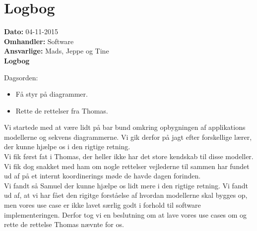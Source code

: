\section{Logbog}

\textbf{Dato:} 04-11-2015 \\
\textbf{Omhandler:} Software \\
\textbf{Ansvarlige:} Mads, Jeppe og Tine \\
\textbf{Logbog}

Dagsorden:
\begin{itemize}
	\item Få styr på diagrammer.
	\item Rette de rettelser fra Thomas. 
\end{itemize}

Vi startede med at være lidt på bar bund omkring opbygningen af applikations modellerne og sekvens diagrammerne. Vi gik derfor på jagt efter forskellige lærer, der kunne hjælpe os i den rigtige retning.\\
Vi fik først fat i Thomas, der heller ikke har det store kendskab til disse modeller. Vi fik dog snakket med ham om nogle rettelser vejlederne til sammen har fundet ud af på et internt koordinerings møde de havde dagen forinden. \\
Vi fandt så Samuel der kunne hjælpe os lidt mere i den rigtige retning. Vi fandt ud af, at vi har fået den rigitge forståelse af hvordan modellerne skal bygges op, men vores use case er ikke lavet særlig godt i forhold til software implementeringen. Derfor tog vi en beslutning om at lave vores use cases om og rette de rettelse Thomas nævnte for os. 
   
